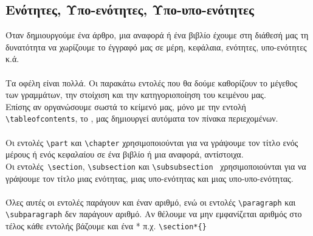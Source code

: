 \documentclass[a4paper, 12pt, oneside, xelatex, final]{article}
\begin{document}
	\subsection{Ενότητες, Υπο-ενότητες, Υπο-υπο-ενότητες}
	\noindent Όταν δημιουργούμε ένα άρθρο, μια αναφορά ή ένα βιβλίο έχουμε στη διάθεσή μας τη δυνατότητα να χωρίζουμε το έγγραφό μας σε μέρη, κεφάλαια, ενότητες, υπο-ενότητες κ.ά.\\
	\\
	Τα οφέλη είναι πολλά. Οι παρακάτω εντολές που θα δούμε καθορίζουν το μέγεθος των γραμμάτων, την στοίχιση και την κατηγοριοποίηση του κειμένου μας.\\
	Επίσης αν οργανώσουμε σωστά το κείμενό μας, μόνο με την εντολή \verb+\tableofcontents+, το \XeLaTeX, μας δημιουργεί αυτόματα τον πίνακα περιεχομένων.\\
	\\
	Οι εντολές \verb+\part+ και \verb+\chapter+ χρησιμοποιούνται για να γράψουμε τον τίτλο ενός μέρους ή ενός κεφαλαίου σε ένα βιβλίο ή μια αναφορά, αντίστοιχα.\\
	Οι εντολές\ \verb+\section+, \verb+\subsection+  και \verb+\subsubsection+ \ χρησιμοποιούνται για να γράψουμε τον τίτλο μιας ενότητας, μιας υπο-ενότητας και μιας υπο-υπο-ενότητας.\\
	\\
	Όλες αυτές οι εντολές παράγουν και έναν αριθμό, ενώ οι εντολές \verb+\paragraph+ και \verb+\subparagraph+ δεν παράγουν αριθμό. Αν θέλουμε να μην εμφανίζεται αριθμός στο τέλος κάθε εντολής βάζουμε και ένα * π.χ. \verb+\section*{}+\\
\end{document}
